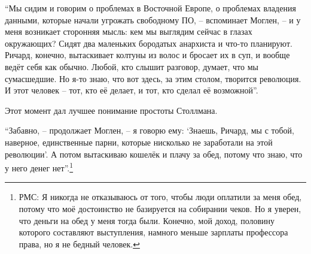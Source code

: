 \enquote{Мы сидим и говорим о проблемах в Восточной Европе, о проблемах владения данными, которые начали угрожать свободному ПО, -- вспоминает Моглен, -- и у меня возникает сторонняя мысль: кем мы выглядим сейчас в глазах окружающих? Сидят два маленьких бородатых анархиста и что-то планируют. Ричард, конечно, вытаскивает колтуны из волос и бросает их в суп, и вообще ведёт себя как обычно. Любой, кто слышит разговор, думает, что мы сумасшедшие. Но я-то знаю, что вот здесь, за этим столом, творится революция. И этот человек -- тот, кто её делает, и тот, кто сделал её возможной}.

Этот момент дал лучшее понимание простоты Столлмана.

\enquote{Забавно, -- продолжает Моглен, -- я говорю ему: \enquote{Знаешь, Ричард, мы с тобой, наверное, единственные парни, которые нисколько не заработали на этой революции}. А потом вытаскиваю кошелёк и плачу за обед, потому что знаю, что у него денег нет}.\footnote{РМС: Я никогда не отказываюсь от того, чтобы люди оплатили за меня обед, потому что моё достоинство не базируется на собирании чеков. Но я уверен, что деньги на обед у меня тогда были. Конечно, мой доход, половину которого составляют выступления, намного меньше зарплаты профессора права, но я не бедный человек.}
